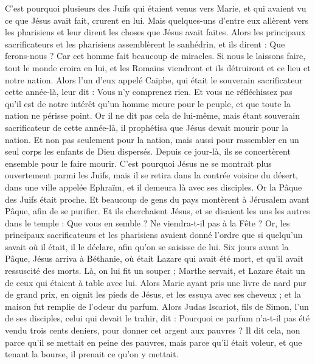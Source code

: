 \begin{multicols}{2}
C'est pourquoi plusieurs des Juifs qui étaient venus vers Marie, et qui avaient vu ce que Jésus avait fait, crurent en lui.
Mais quelques-uns d'entre eux allèrent vers les pharisiens et leur dirent les choses que Jésus avait faites.
Alors les principaux sacrificateurs et les pharisiens assemblèrent le sanhédrin, et ils dirent : Que ferons-nous ? Car cet homme fait beaucoup de miracles.
Si nous le laissons faire, tout le monde croira en lui, et les Romains viendront et ils détruiront et ce lieu et notre nation.
Alors l'un d'eux appelé Caïphe, qui était le souverain sacrificateur cette année-là, leur dit : Vous n'y comprenez rien.
Et vous ne réfléchissez pas qu'il est de notre intérêt qu'un homme meure pour le peuple, et que toute la nation ne périsse point.
Or il ne dit pas cela de lui-même, mais étant souverain sacrificateur de cette année-là, il prophétisa que Jésus devait mourir pour la nation.
Et non pas seulement pour la nation, mais aussi pour rassembler en un seul corps les enfants de Dieu dispersés.
Depuis ce jour-là, ils se concertèrent ensemble pour le faire mourir.
C'est pourquoi Jésus ne se montrait plus ouvertement parmi les Juifs, mais il se retira dans la contrée voisine du désert, dans une ville appelée Ephraïm, et il demeura là avec ses disciples.
Or la Pâque des Juifs était proche. Et beaucoup de gens du pays montèrent à Jérusalem avant Pâque, afin de se purifier.
Et ils cherchaient Jésus, et se disaient les uns les autres dans le temple : Que vous en semble ? Ne viendra-t-il pas à la Fête ?
Or, les principaux sacrificateurs et les pharisiens avaient donné l'ordre que si quelqu'un savait où il était, il le déclare, afin qu'on se saisisse de lui.
\VerseOne{}Six jours avant la Pâque, Jésus arriva à Béthanie, où était Lazare qui avait été mort, et qu'il avait ressuscité des morts.
Là, on lui fit un souper ; Marthe servait, et Lazare était un de ceux qui étaient à table avec lui.
Alors Marie ayant pris une livre de nard pur de grand prix, en oignit les pieds de Jésus, et les essuya avec ses cheveux ; et la maison fut remplie de l'odeur du parfum.
Alors Judas Iscariot, fils de Simon, l'un de ses disciples, celui qui devait le trahir, dit :
Pourquoi ce parfum n'a-t-il pas été vendu trois cents deniers, pour donner cet argent aux pauvres ?
Il dit cela, non parce qu'il se mettait en peine des pauvres, mais parce qu'il était voleur, et que tenant la bourse, il prenait ce qu'on y mettait.

\end{multicols}
